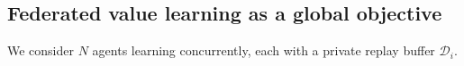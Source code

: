







\subsection{Federated value learning as a global objective}
We consider $N$ agents learning concurrently, each with a private replay buffer $\mathcal{D}_i$.

